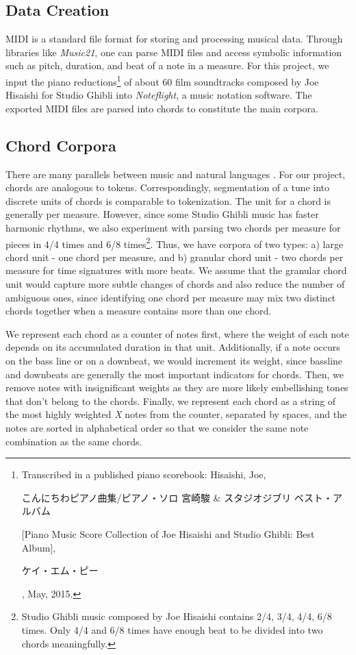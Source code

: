 \documentclass[11pt,a4paper]{article}
\begin{document}
\subsection{Data Creation}
MIDI is a standard file format for storing and processing musical data. Through libraries like \emph{Music21}, one can parse MIDI files and access symbolic information such as pitch, duration, and beat of a note in a measure. For this project, we input the piano reductions\footnote{Transcribed in a published piano scorebook: Hisaishi, Joe, 
\begin{CJK}{UTF8}{min}こんにちわピアノ曲集/ピアノ・ソロ 宮崎駿 \& スタジオジブリ ベスト・アルバム\end{CJK} [Piano Music Score Collection of Joe Hisaishi and Studio Ghibli: Best Album],\begin{CJK}{UTF8}{min}ケイ・エム・ピー\end{CJK}, May, 2015.} of about 60 film soundtracks composed by Joe Hisaishi for Studio Ghibli into \emph{Noteflight}, a music notation software. The exported MIDI files are parsed into chords to constitute the main corpora. 


\subsection{Chord Corpora}
There are many parallels between music and natural languages \citep{ponsford1999}. For our project, chords are analogous to tokens. Correspondingly, segmentation of a tune into discrete units of chords is comparable to tokenization. The unit for a chord is generally per measure. However, since some Studio Ghibli music has faster harmonic rhythms, we also experiment with parsing two chords per measure for pieces in 4/4 times and 6/8 times\footnote{ Studio Ghibli music composed by Joe Hisaishi contains 2/4, 3/4, 4/4, 6/8 times. Only 4/4 and 6/8 times have enough beat to be divided into two chords meaningfully.}. Thus, we have corpora of two types: a) large chord unit - one chord per measure, and b) granular chord unit - two chords per measure for time signatures with more beats. We assume that the granular chord unit would capture more subtle changes of chords and also reduce the number of ambiguous ones, since identifying one chord per measure may mix two distinct chords together when a measure contains more than one chord.

We represent each chord as a counter of notes first, where the weight of each note depends on its accumulated duration in that unit. Additionally, if a note occurs on the bass line or on a downbeat, we would increment its weight, since bassline and downbeats are generally the most important indicators for chords. Then, we remove notes with insignificant weights as they are more likely embellishing tones that don’t belong to the chords. Finally, we represent each chord as a string of the most highly weighted \emph{X} notes from the counter, separated by spaces, and the notes are sorted in alphabetical order so that we consider the same note combination as the same chords. 
\end{document}

